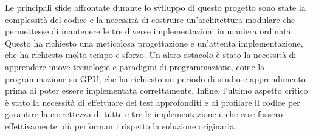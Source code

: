 Le principali sfide affrontate durante lo sviluppo di questo progetto sono state
la complessità del codice e la necessità di costruire un'architettura modulare
che permettesse di mantenere le tre diverse implementazioni in maniera ordinata.
Questo ha richiesto una meticolosa progettazione e un'attenta implementazione,
che ha richiesto molto tempo e sforzo. Un altro ostacolo è stato la necessità di
apprendere nuove tecnologie e paradigmi di programmazione, come la
programmazione su GPU, che ha richiesto un periodo di studio e apprendimento prima
di poter essere implementata correttamente. Infine, l'ultimo aspetto critico è stato
la necessità di effettuare dei test approfonditi e di profilare il codice per garantire
la correttezza di tutte e tre le implementazione e che esse fossero effettivamente
più performanti rispetto la soluzione originaria.